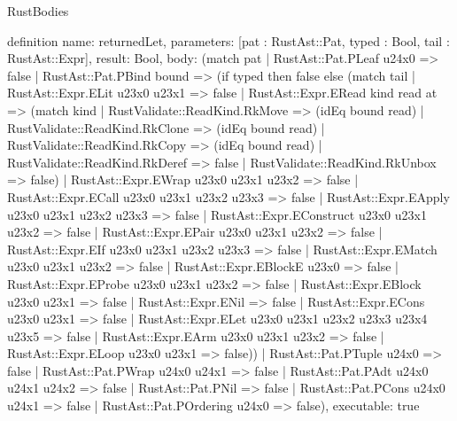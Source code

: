 \begin{lexlean}{RustBodies}
\begin{semanticmodule}
definition{
  name: returnedLet,
  parameters: [pat : RustAst::Pat, typed : Bool, tail : RustAst::Expr],
  result: Bool,
  body: (match pat
    | RustAst::Pat.PLeaf u24x0 => false
    | RustAst::Pat.PBind bound => (if typed then false else (match tail
      | RustAst::Expr.ELit u23x0 u23x1 => false
      | RustAst::Expr.ERead kind read at => (match kind
        | RustValidate::ReadKind.RkMove => (idEq bound read)
        | RustValidate::ReadKind.RkClone => (idEq bound read)
        | RustValidate::ReadKind.RkCopy => (idEq bound read)
        | RustValidate::ReadKind.RkDeref => false
        | RustValidate::ReadKind.RkUnbox => false)
      | RustAst::Expr.EWrap u23x0 u23x1 u23x2 => false
      | RustAst::Expr.ECall u23x0 u23x1 u23x2 u23x3 => false
      | RustAst::Expr.EApply u23x0 u23x1 u23x2 u23x3 => false
      | RustAst::Expr.EConstruct u23x0 u23x1 u23x2 => false
      | RustAst::Expr.EPair u23x0 u23x1 u23x2 => false
      | RustAst::Expr.EIf u23x0 u23x1 u23x2 u23x3 => false
      | RustAst::Expr.EMatch u23x0 u23x1 u23x2 => false
      | RustAst::Expr.EBlockE u23x0 => false
      | RustAst::Expr.EProbe u23x0 u23x1 u23x2 => false
      | RustAst::Expr.EBlock u23x0 u23x1 => false
      | RustAst::Expr.ENil => false
      | RustAst::Expr.ECons u23x0 u23x1 => false
      | RustAst::Expr.ELet u23x0 u23x1 u23x2 u23x3 u23x4 u23x5 => false
      | RustAst::Expr.EArm u23x0 u23x1 u23x2 => false
      | RustAst::Expr.ELoop u23x0 u23x1 => false))
    | RustAst::Pat.PTuple u24x0 => false
    | RustAst::Pat.PWrap u24x0 u24x1 => false
    | RustAst::Pat.PAdt u24x0 u24x1 u24x2 => false
    | RustAst::Pat.PNil => false
    | RustAst::Pat.PCons u24x0 u24x1 => false
    | RustAst::Pat.POrdering u24x0 => false),
  executable: true
}


\end{semanticmodule}
\end{lexlean}
